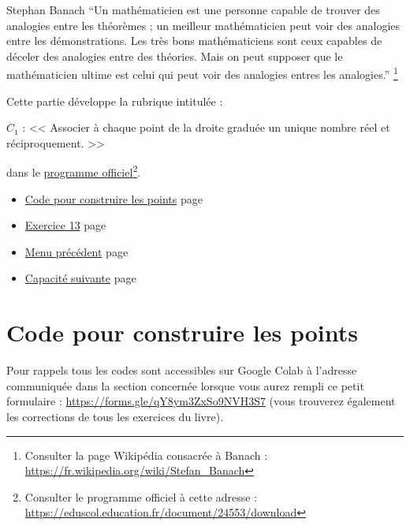 \documentclass[a4paper,11pt]{book}
\begin{document}
\begin{myquote}{Stephan Banach}
\enquote{Un mathématicien est une personne capable de trouver des analogies
entre les théorèmes ; un meilleur mathématicien peut voir des
analogies entre les démonstrations. Les très bons mathématiciens
sont ceux capables de déceler des analogies entre des
théories. Mais on peut supposer que le mathématicien ultime est
celui qui peut voir des analogies entres les analogies.}
\footnote{Consulter la page Wikipédia consacrée à Banach : \url{https://fr.wikipedia.org/wiki/Stefan_Banach}}
\end{myquote}

\clearpage


Cette partie développe la rubrique intitulée :

\(C_{1}\) : << Associer à chaque point de la droite graduée un unique
nombre réel et réciproquement. >>

dans le \href{https://eduscol.education.fr/document/24553/download}{programme officiel}\footnote{Consulter le programme officiel à cette adresse :
\url{https://eduscol.education.fr/document/24553/download}}.
\clearpage


\label{orgccf1b93}
\label{page:capacity1-menu}
\begin{itemize}
\item \hyperref[orgd1ad3aa]{Code pour construire les points} page \pageref{page:sec3.2.1pts}
\item \hyperref[org6da0729]{Exercice 13} page \pageref{page:sec3.2.2exo13}
\item \hyperref[orgb90956a]{Menu précédent} page \pageref{page:capacities-menu}
\item \hyperref[org3ab5664]{Capacité suivante} page \pageref{page:sec3.3capacity2}
\end{itemize}



\clearpage

\section{Code pour construire les points}
\label{sec:org6c5bc93}
\label{orgd1ad3aa}
\label{page:sec3.2.1pts}

Pour rappels tous les codes sont accessibles sur Google Colab à
l'adresse communiquée dans la section concernée lorsque vous
aurez rempli ce petit formulaire : \url{https://forms.gle/qY8ym3ZxSo9NVH3S7}
(vous trouverez également les corrections de tous les exercices du
livre).
\end{document}
